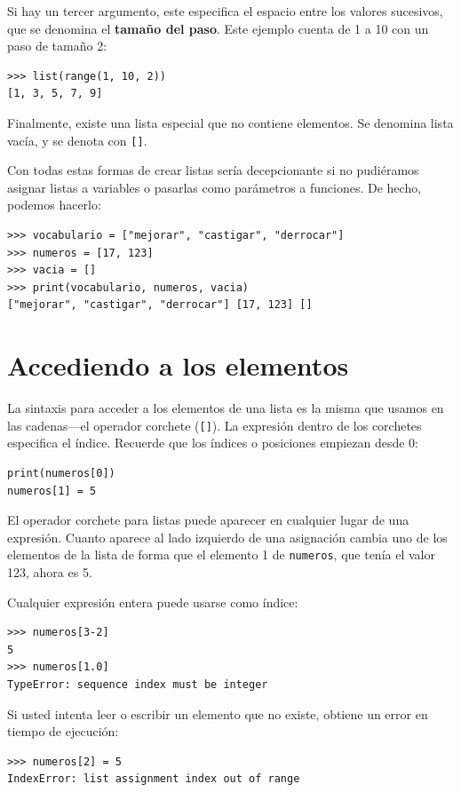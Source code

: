 Si hay un tercer argumento, este especifica el espacio entre los valores
sucesivos, que se denomina el \textbf{tamaño del paso}. Este ejemplo
cuenta de 1 a 10 con un paso de tamaño 2:
\begin{verbatim}
>>> list(range(1, 10, 2))
[1, 3, 5, 7, 9]
\end{verbatim}

Finalmente, existe una lista especial que no contiene elementos. Se
denomina lista vacía, y se denota con \texttt{{[}{]}}.

Con todas estas formas de crear listas sería decepcionante si no pudiéramos
asignar listas a variables o pasarlas como parámetros a funciones.
De hecho, podemos hacerlo:
\begin{verbatim}
>>> vocabulario = ["mejorar", "castigar", "derrocar"]
>>> numeros = [17, 123]
>>> vacia = []
>>> print(vocabulario, numeros, vacia)
["mejorar", "castigar", "derrocar"] [17, 123] []
\end{verbatim}

\section{Accediendo a los elementos}

 

La sintaxis para acceder a los elementos de una lista es la misma
que usamos en las cadenas—el operador corchete (\texttt{{[}{]}}).
La expresión dentro de los corchetes especifica el índice. Recuerde
que los índices o posiciones empiezan desde 0:
\begin{verbatim}
print(numeros[0])
numeros[1] = 5
\end{verbatim}

El operador corchete para listas puede aparecer en cualquier lugar
de una expresión. Cuanto aparece al lado izquierdo de una asignación
cambia uno de los elementos de la lista de forma que el elemento 1
de \texttt{numeros}, que tenía el valor 123, ahora es 5.

Cualquier expresión entera puede usarse como índice:
\begin{verbatim}
>>> numeros[3-2]
5
>>> numeros[1.0]
TypeError: sequence index must be integer
\end{verbatim}

Si usted intenta leer o escribir un elemento que no existe, obtiene
un error en tiempo de ejecución:

\begin{verbatim}
>>> numeros[2] = 5
IndexError: list assignment index out of range
\end{verbatim}

